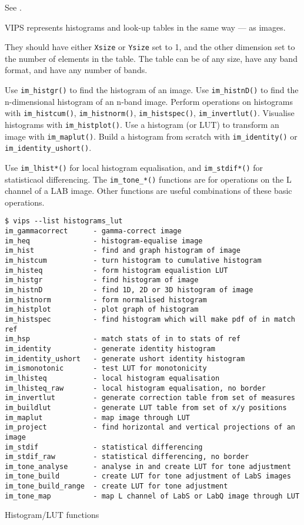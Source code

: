 See .

VIPS represents histograms and look-up tables in the same way --- as images.

They should have either \verb+Xsize+ or \verb+Ysize+ set to 1, and the
other dimension set to the number of elements in the table. The table can be
of any size, have any band format, and have any number of bands.

Use \verb+im_histgr()+ to find the histogram of an image.  Use
\verb+im_histnD()+ to find the n-dimensional histogram of an n-band
image.  Perform operations on histograms with \verb+im_histcum()+,
\verb+im_histnorm()+, \verb+im_histspec()+, \verb+im_invertlut()+. Visualise
histograms with \verb+im_histplot()+. Use a histogram (or LUT) to transform
an image with \verb+im_maplut()+. Build a histogram from scratch with
\verb+im_identity()+ or \verb+im_identity_ushort()+.

Use \verb+im_lhist*()+ for local histogram equalisation, and
\verb+im_stdif*()+ for statisticaol differencing. The \verb+im_tone_*()+
functions are for operations on the L channel of a LAB image. Other
functions are useful combinations of these basic operations.

\begin{fig2}
\begin{verbatim}
$ vips --list histograms_lut
im_gammacorrect      - gamma-correct image
im_heq               - histogram-equalise image
im_hist              - find and graph histogram of image
im_histcum           - turn histogram to cumulative histogram
im_histeq            - form histogram equalistion LUT
im_histgr            - find histogram of image
im_histnD            - find 1D, 2D or 3D histogram of image
im_histnorm          - form normalised histogram
im_histplot          - plot graph of histogram
im_histspec          - find histogram which will make pdf of in match ref
im_hsp               - match stats of in to stats of ref
im_identity          - generate identity histogram
im_identity_ushort   - generate ushort identity histogram
im_ismonotonic       - test LUT for monotonicity
im_lhisteq           - local histogram equalisation
im_lhisteq_raw       - local histogram equalisation, no border
im_invertlut         - generate correction table from set of measures
im_buildlut          - generate LUT table from set of x/y positions
im_maplut            - map image through LUT
im_project           - find horizontal and vertical projections of an image
im_stdif             - statistical differencing
im_stdif_raw         - statistical differencing, no border
im_tone_analyse      - analyse in and create LUT for tone adjustment
im_tone_build        - create LUT for tone adjustment of LabS images
im_tone_build_range  - create LUT for tone adjustment
im_tone_map          - map L channel of LabS or LabQ image through LUT
\end{verbatim}
\caption{Histogram/LUT functions}
\label{fg:hist}
\end{fig2}
  
